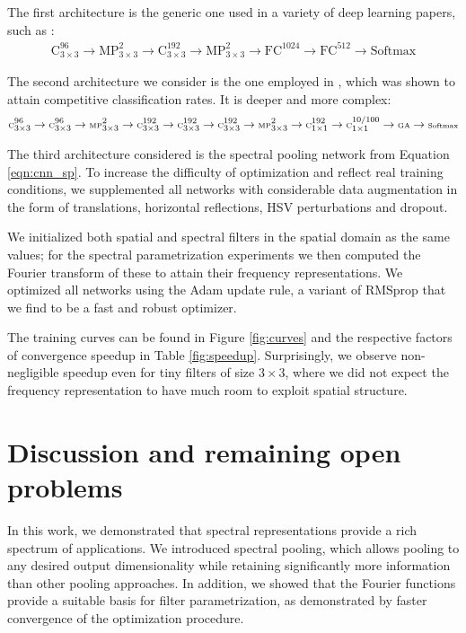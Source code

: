 \documentclass{article} %
\begin{document}
The first architecture is the generic one used in a variety of deep learning papers, such as \citet{krizhevsky-et-al-2012,snoek-etal-2012b,Krizhevsky09learningmultiple,adam2015}:
\begin{align}
\textrm{C}^{96}_{3\times 3}\rightarrow\textrm{MP}_{3\times3}^2\rightarrow
\textrm{C}^{192}_{3\times 3}\rightarrow\textrm{MP}_{3\times3}^2\rightarrow 
\textrm{FC}^{1024}\rightarrow\textrm{FC}^{512}\rightarrow\textrm{Softmax}
\label{eqn:cnn_generic}
\end{align}

The second architecture we consider is the one employed in \citet{scalable_2015}, which was shown to attain competitive classification rates. It is deeper and more complex:
\begin{align}
\tiny
\textrm{C}^{96}_{3\times 3}\rightarrow\textrm{C}^{96}_{3\times 3}\rightarrow\textrm{MP}_{3\times3}^2\rightarrow
\textrm{C}^{192}_{3\times 3}\rightarrow\textrm{C}^{192}_{3\times 3}\rightarrow\textrm{C}^{192}_{3\times 3}\rightarrow\textrm{MP}_{3\times3}^2\rightarrow 
\textrm{C}^{192}_{1\times 1}\rightarrow\textrm{C}^{10/100}_{1\times 1}\rightarrow\textrm{GA}\rightarrow\textrm{Softmax}
\label{eqn:cnn_optimal}
\end{align}

The third architecture considered is the spectral pooling network from Equation \ref{eqn:cnn_sp}. To increase the difficulty of optimization and reflect real training conditions, we supplemented all networks with considerable data augmentation in the form of translations, horizontal reflections, HSV perturbations and dropout.

We initialized both spatial and spectral filters in the spatial domain as the same values; for the spectral parametrization experiments we then computed the Fourier transform of these to attain their frequency representations. We optimized all networks using the Adam \citep{adam2015} update rule, a variant of RMSprop that we find to be a fast and robust optimizer.

The training curves can be found in Figure \ref{fig:curves} and the respective factors of convergence speedup in Table \ref{fig:speedup}. Surprisingly, we observe non-negligible speedup even for tiny filters of size $3\times 3$, where we did not expect the frequency representation to have much room to exploit spatial structure. 


\section{Discussion and remaining open problems}
\label{sec:discussion}
In this work, we demonstrated that spectral representations provide a rich spectrum of applications. We introduced spectral pooling, which allows pooling to any desired output dimensionality while retaining significantly more information than other pooling approaches. In addition, we showed that the Fourier functions provide a suitable basis for filter parametrization, as demonstrated by faster convergence of the optimization procedure.
\end{document}

